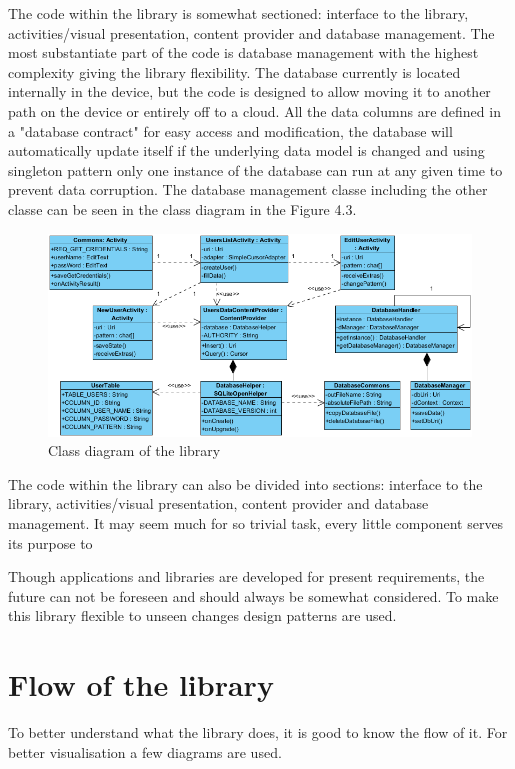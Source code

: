 The code within the library is somewhat sectioned: interface to the library, activities/visual presentation, content provider and database management. The most substantiate part of the code is database management with the highest complexity giving  the library flexibility. The database currently is located internally in the device, but the code is designed to allow moving it to another path on the device or entirely off to a cloud. All the data columns are defined in a "database contract" for easy access and modification, the database will automatically update itself if the underlying data model is changed and using singleton pattern only one instance of the database can run at any given time to prevent data corruption. The database management classe including the other classe can be seen in the class diagram in the Figure 4.3.

\begin{figure}[h]
\begin{center}
\includegraphics[scale=0.7]{images/classdiagram.png}
\caption{Class diagram of the library} \label{fig:class diagram} 
\end{center}
\end{figure}

The code within the library can also be divided into sections: interface to the library, activities/visual presentation, content provider and database management. It may seem much for so trivial task, every little component serves its purpose to 

Though applications and libraries are developed for present requirements, the future can not be foreseen and should always be somewhat considered. To make this library flexible to unseen changes design patterns are used. 

\section{Flow of the library}
To better understand what the library does, it is good to know the flow of it. For better visualisation a few diagrams are used.

